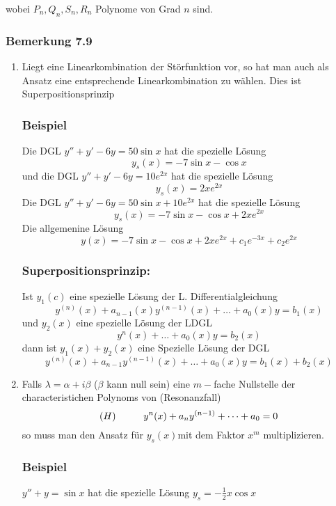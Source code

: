 wobei $P_n,Q_n,S_n,R_n$ Polynome von Grad $n$ sind.
\subsubsection*{Bemerkung 7.9}
\begin{enumerate}
\item {}Liegt eine Linearkombination der Störfunktion vor, so hat man auch als Ansatz eine entsprechende Linearkombination zu wählen. Dies ist Superpositionsprinzip
\subsubsection*{Beispiel}
Die DGL $y''+y'-6y=50\sin x$ hat die spezielle Lösung $$y_s(x)=-7\sin x-\cos x$$ und die DGL $y''+y'-6y=10e^{2x}$ hat die spezielle Lösung $$y_s(x)=2xe^{2x}$$Die DGL $y''+y'-6y=50\sin x+10e^{2x}$ hat die spezielle Lösung $$y_s(x)=-7\sin x-\cos x+2xe^{2x}$$ Die allgemenine Lösung $$y(x)=-7\sin x -\cos x+2xe^{2x}+c_1e^{-3x}+c_2e^{2x}$$
\subsubsection*{Superpositionsprinzip:}
Ist $y_1(c)$ eine spezielle Lösung der L. Differentialgleichung $$y^{(n)}(x)+a_{n-1}(x)y^{(n-1)}(x)+\dots +a_0(x)y=b_1(x)$$ und $y_2(x)$ eine spezielle Lösung der LDGL $$y^n(x)+\dots +a_0(x)y=b_2(x)$$ dann ist $y_1(x)+y_2(x)$ eine Spezielle Lösung der DGL $$y^{(n)}(x)+a_{n-1}y^{(n-1)}(x)+\dots+a_0(x)y=b_1(x)+b_2(x)$$
\item Falls $\lambda=\alpha +i\beta$ ($\beta$ kann null sein) eine $m-$fache Nullstelle der characteristichen Polynoms von (Resonanzfall) $$(H)\hspace{10mm}y^n(x)+a_ny^{(n-1)}+\dots +a_0=0$$so muss man den Ansatz für $y_s(x)$mit dem Faktor $x^m$ multiplizieren.
\subsubsection*{Beispiel}
$y''+y=\sin x$ hat die spezielle Lösung $y_s=-\frac{1}{2}x\cos x$



\begin{figure}[ht]
\begin{minipage}[b]{0.45\linewidth}
\begin{center}
\end{center}
\end{minipage}
\hspace{0.5cm}
\begin{minipage}[b]{0.45\linewidth}


\end{minipage}
\end{figure}
\end{enumerate}
